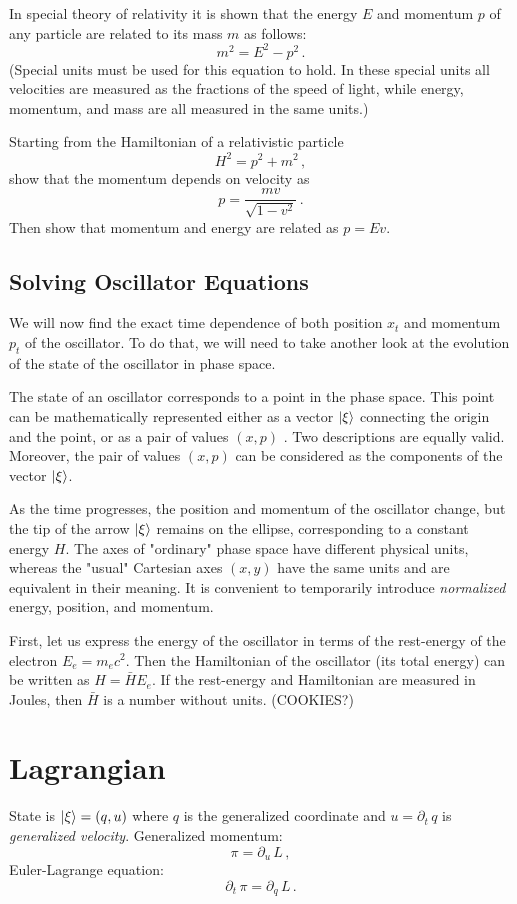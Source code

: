 \begin{exercise}
	In special theory of relativity it is shown that the energy $E$ and momentum $p$ of any particle are related to its mass $m$ as follows:
	\[
	m^2=E^2-p^2\,.
	\]
	(Special units must be used for this equation to hold. In these special units all velocities are measured as the fractions of the speed of light, while energy, momentum, and mass are all measured in the same units.)
	
	Starting from the Hamiltonian of a relativistic particle 
	\[
	H^2=p^2+m^2\,,
	\]
	show that the momentum depends on velocity as
	\[
	p=\frac{mv}{\sqrt{1-v^2}}\,.
	\]
	Then show that momentum and energy are related as $p=Ev$.
\end{exercise}

\subsection{Solving Oscillator Equations}
We will now find the exact time dependence of both position $x_t$ and momentum $p_t$ of the oscillator. To do that, we will need to take another look at the evolution of the state of the oscillator in phase space.

The state of an oscillator corresponds to a point in the phase space. This point can be mathematically represented either as a vector $|{\xi}\rangle$ connecting the origin and the point, or as a pair of values $(x,p)$ . Two descriptions are equally valid. Moreover, the pair of values $(x,p)$  can be considered as the components of the vector $|{\xi}\rangle$. 

As the time progresses, the position and momentum of the oscillator change, but the tip of the arrow $|{\xi}\rangle$ remains on the ellipse, corresponding to a constant energy $H$. The axes of "ordinary" phase space have different physical units, whereas the "usual" Cartesian axes $(x,y)$ have the same units and are equivalent in their meaning. It is convenient to temporarily introduce \emph{normalized} energy, position, and momentum.

First, let us express the energy of the oscillator in terms of the rest-energy of the electron $E_e=m_e c^2$. Then the Hamiltonian of the oscillator (its total energy) can be written as $H=\bar{H}E_e$. If the rest-energy and Hamiltonian are measured in Joules, then $\bar{H}$ is a number without units. (COOKIES?)

\section{Lagrangian}\label{sec:Lagrangian}
State is $|{\xi}\rangle=(q, u)$ where $q$ is the generalized coordinate and $u=\partial_t\, q$ is \emph{generalized velocity}.
Generalized momentum:
\[
\pi = \partial_u\,L\,,
\]
Euler-Lagrange equation:
\[
\partial_t\,\pi = \partial_q\,L\,.
\]


